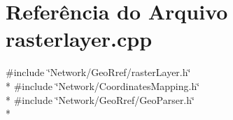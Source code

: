 \section{Referência do Arquivo rasterlayer.\+cpp}
\label{rasterlayer_8cpp}
{\ttfamily \#include \char`\"{}Network/\+Geo\+Rref/raster\+Layer.\+h\char`\"{}}\\*
{\ttfamily \#include \char`\"{}Network/\+Coordinates\+Mapping.\+h\char`\"{}}\\*
{\ttfamily \#include \char`\"{}Network/\+Geo\+Rref/\+Geo\+Parser.\+h\char`\"{}}\\*
